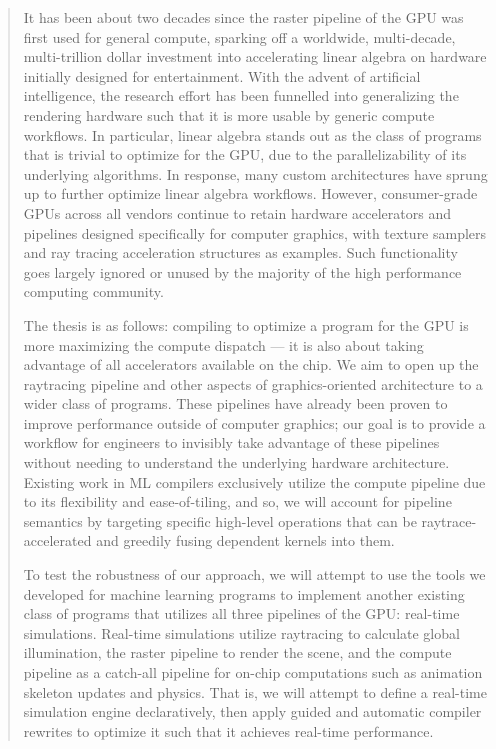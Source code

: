 \documentclass[review, acmsmall, nonacm]{acmart}
\begin{document}
\begin{abstract}
It has been about two decades since the raster pipeline of the GPU was first used for general compute, sparking off a worldwide, multi-decade, multi-trillion dollar investment into accelerating linear algebra on hardware initially designed for entertainment. With the advent of artificial intelligence, the research effort has been funnelled into generalizing the rendering hardware such that it is more usable by generic compute workflows. In particular, linear algebra stands out as the class of programs that is trivial to optimize for the GPU, due to the parallelizability of its underlying algorithms. In response, many custom architectures have sprung up to further optimize linear algebra workflows. However, consumer-grade GPUs across all vendors continue to retain hardware accelerators and pipelines designed specifically for computer graphics, with texture samplers and ray tracing acceleration structures as examples. Such functionality goes largely ignored or unused by the majority of the high performance computing community.

The thesis is as follows: compiling to optimize a program for the GPU is more maximizing the compute dispatch --- it is also about taking advantage of all accelerators available on the chip. We aim to open up the raytracing pipeline and other aspects of graphics-oriented architecture to a wider class of programs. These pipelines have already been proven to improve performance outside of computer graphics; our goal is to provide a workflow for engineers to invisibly take advantage of these pipelines without needing to understand the underlying hardware architecture. Existing work in ML compilers exclusively utilize the compute pipeline due to its flexibility and ease-of-tiling, and so, we will account for pipeline semantics by targeting specific high-level operations that can be raytrace-accelerated and greedily fusing dependent kernels into them.

To test the robustness of our approach, we will attempt to use the tools we developed for machine learning programs to implement another existing class of programs that utilizes all three pipelines of the GPU: real-time simulations. Real-time simulations utilize raytracing to calculate global illumination, the raster pipeline to render the scene, and the compute pipeline as a catch-all pipeline for on-chip computations such as animation skeleton updates and physics. That is, we will attempt to define a real-time simulation engine declaratively, then apply guided and automatic compiler rewrites to optimize it such that it achieves real-time performance.


\end{abstract}
\end{document}
